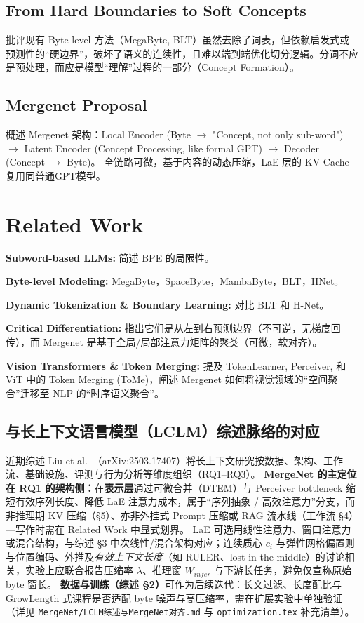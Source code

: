 \documentclass[a4paper,11pt]{ctexart}
\begin{document}
\subsection{From Hard Boundaries to Soft Concepts}
批评现有 Byte-level 方法（MegaByte, BLT）虽然去除了词表，但依赖启发式或预测性的“硬边界”，破坏了语义的连续性，且难以端到端优化切分逻辑。分词不应是预处理，而应是模型“理解”过程的一部分（Concept Formation）。

\subsection{Mergenet Proposal}
概述 Mergenet 架构：Local Encoder (Byte $\to$ "Concept, not only sub-word") $\to$ Latent Encoder (Concept Processing, like formal GPT) $\to$ Decoder (Concept $\to$ Byte)。
全链路可微，基于内容的动态压缩，LaE 层的 KV Cache 复用同普通GPT模型。

\section{Related Work}

\textbf{Subword-based LLMs:} 简述 BPE 的局限性。

\textbf{Byte-level Modeling:} MegaByte，SpaceByte，MambaByte，BLT，HNet。

\textbf{Dynamic Tokenization \& Boundary Learning:} 对比 BLT 和 H-Net。

\textbf{Critical Differentiation:} 指出它们是从左到右预测边界（不可逆，无梯度回传），而 Mergenet 是基于全局/局部注意力矩阵的聚类（可微，软对齐）。

\textbf{Vision Transformers \& Token Merging:} 提及 TokenLearner, Perceiver, 和 ViT 中的 Token Merging (ToMe)，阐述 Mergenet 如何将视觉领域的“空间聚合”迁移至 NLP 的“时序语义聚合”。

\subsection{与长上下文语言模型（LCLM）综述脉络的对应}
近期综述 Liu et al.\ （arXiv:2503.17407）将长上下文研究按数据、架构、工作流、基础设施、评测与行为分析等维度组织（RQ1--RQ3）。
\textbf{MergeNet 的主定位在 RQ1 的架构侧：}在\textbf{表示层}通过可微合并（DTEM）与 Perceiver bottleneck 缩短有效序列长度、降低 LaE 注意力成本，属于``序列抽象 / 高效注意力''分支，而非推理期 KV 压缩（\S5）、亦非外挂式 Prompt 压缩或 RAG 流水线（工作流 \S4）---写作时需在 Related Work 中显式划界。
LaE 可选用线性注意力、窗口注意力或混合结构，与综述 \S3 中次线性/混合架构对应；连续质心 $c_i$ 与弹性网格偏置则与位置编码、外推及\textit{有效上下文长度}（如 RULER、lost-in-the-middle）的讨论相关，实验上应联合报告压缩率 $\lambda$、推理窗 $W_{infer}$ 与下游长任务，避免仅宣称原始 byte 窗长。
\textbf{数据与训练（综述 \S2）}可作为后续迭代：长文过滤、长度配比与 GrowLength 式课程是否适配 byte 噪声与高压缩率，需在扩展实验中单独验证（详见 \texttt{MergeNet/LCLM综述与MergeNet对齐.md} 与 \texttt{optimization.tex} 补充清单）。
\end{document}
